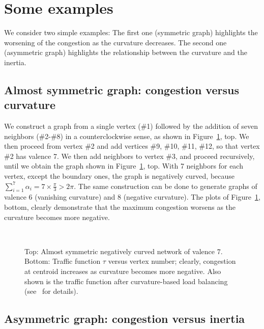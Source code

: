 \documentclass{article}
\begin{document}
\noindent 

\noindent 

\noindent 
\section{Some examples}
\label{s:examples}

We consider two simple examples: 
The first one (symmetric graph) highlights the worsening of the congestion as the curvature decreases. 
The second one (asymmetric graph) highlights the relationship between the curvature and the inertia. 

\subsection{Almost symmetric graph: congestion versus curvature}

We construct a graph from a single vertex (\#1)  
followed by the addition of seven neighbors (\#2-\#8) in a counterclockwise sense, 
as shown in Figure~\ref{f:congestion_versus_degree}, top. 
We then proceed from vertex \#2 and add vertices \#9, \#10, \#11, \#12, 
so that vertex \#2 has valence 7. We then add neighbors to vertex \#3, 
and proceed recursively, 
until we obtain the graph shown in Figure~\ref{f:congestion_versus_degree}, top. 
With 7 neighbors for each vertex, except the boundary ones, the graph is negatively curved, 
because $\sum_{i=1}^7 \alpha_i=7\times \frac{\pi}{3}>2 \pi$.  
The same construction can be done to generate graphs of valence 6 (vanishing curvature) 
and 8 (negative curvature). 
The plots of Figure~\ref{f:congestion_versus_degree}, bottom, clearly demonstrate 
that the maximum congestion worsens as the curvature becomes more negative. 

\begin{figure}[t]
\centering
\mbox{
} 
\caption{Top: Almost symmetric negatively curved network of valence $7$. 
Bottom: Traffic function $\tau$ versus vertex number; 
clearly, congestion at centroid increases as curvature becomes more negative. 
Also shown is the traffic function after curvature-based load balancing 
(see~\cite{mingjithesis} for details).
}
\label{f:congestion_versus_degree}
\end{figure}


\subsection{Asymmetric graph: congestion versus inertia}
\end{document}
